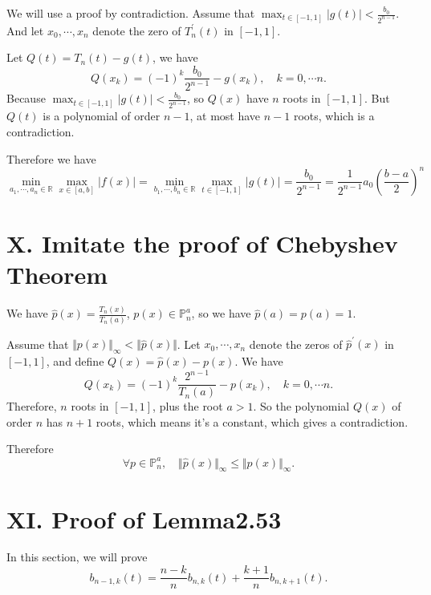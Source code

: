 \documentclass[a4paper]{article}
\begin{document}
We will use a proof by contradiction. Assume that $\max_{t\in[-1,1]} \vert g(t) \vert < \frac{b_0}{2^{n-1}}$. And let $x_0, \cdots, x_n$ denote the zero of $T^{\prime}_n(t)$ in $[-1,1]$.

Let $Q(t) = T_n(t) - g(t)$, we have
\begin{equation}
  Q(x_k) = (-1)^k \frac{b_0}{2^{n-1}} - g(x_k), \quad k=0,\cdots n.
\end{equation}
Because $\max_{t\in[-1,1]} \vert g(t) \vert < \frac{b_0}{2^{n-1}}$, so $Q(x)$ have $n$ roots in $[-1,1]$. But $Q(t)$ is a polynomial of order $n-1$, at most have $n-1$ roots, which is a contradiction. 

Therefore we have
\begin{equation}
  \min_{a_1,\cdots,a_n\in\mathbb{R}} \max_{x\in[a,b]} \vert f(x) \vert = \min_{b_1,\cdots,b_n \in \mathbb{R}} \max_{t\in[-1,1]} \vert g(t) \vert = \frac{b_0}{2^{n-1}} = \frac{1}{2^{n-1}} a_0 (\frac{b-a}{2})^n 
\end{equation}


\section*{X. Imitate the proof of Chebyshev Theorem}
We have $\hat{p}(x) = \frac{T_n(x)}{T_n(a)}$, $p(x) \in \mathbb{P}^a_n$, so we have $\hat{p}(a) = p(a) = 1$. 

Assume that $\Vert p(x) \Vert _{\infty} < \Vert \hat{p}(x) \Vert$. Let $x_0,\cdots,x_n$ denote the zeros of $\hat{p}^{\prime}(x)$ in $[-1,1]$, and define $Q(x) = \hat{p}(x) - p(x)$. We have
\begin{equation}
  Q(x_k) = (-1)^k \frac{2^{n-1}}{T_n(a)} - p(x_k), \quad k=0,\cdots n.
\end{equation}
Therefore, $n$ roots in $[-1,1]$, plus the root $a > 1$. So the polynomial $Q(x)$ of order $n$ has $n+1$ roots, which means it's a constant, which gives a contradiction. 

Therefore 
\begin{equation}
  \forall p \in \mathbb{P}^a_n, \quad \Vert \hat{p}(x) \Vert_{\infty} \leq \Vert p(x) \Vert _{\infty}.
\end{equation}

\section*{XI. Proof of Lemma2.53}
In this section, we will prove 
\begin{equation}
  b_{n-1,k}(t) = \frac{n-k}{n} b_{n,k}(t) + \frac{k+1}{n} b_{n,k+1}(t). 
\end{equation}
\end{document}
